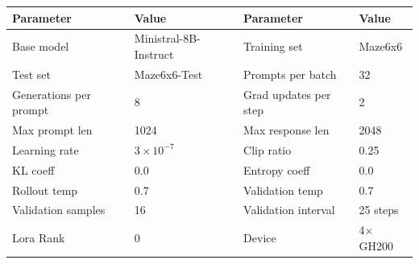 \documentclass{article}
\theoremstyle{plain}
\theoremstyle{definition}
\theoremstyle{remark}
\begin{document}
\begin{table}[h]
  \centering
  \label{tab:config-maze}
  \begin{tcolorbox}[
    enhanced, hbox,
    title={Training setup for Maze},
    colback=teal!5, colframe=teal, coltext=black, coltitle=white,
    fonttitle=\bfseries, arc=1mm, boxrule=1pt, boxsep=1pt,
    left=2pt, right=2pt, top=0pt, bottom=2pt,
    toptitle=3pt, bottomtitle=3pt, center
  ]
    \small
    \renewcommand{\arraystretch}{1.2}
    \setlength{\tabcolsep}{8pt}
    \begin{tabular}{l|l|l|l}
      \textbf{Parameter} & \textbf{Value} & \textbf{Parameter} & \textbf{Value} \\
      \hline
      Base model & Ministral-8B-Instruct & Training set & Maze6x6 \\
      Test set & Maze6x6-Test & Prompts per batch & 32 \\
      Generations per prompt & 8 & Grad updates per step & 2 \\
      Max prompt len & 1024 & Max response len & 2048 \\
      Learning rate & $3 \times 10^{-7}$ & Clip ratio & 0.25 \\
      KL coeff & 0.0 & Entropy coeff & 0.0 \\
      Rollout temp & 0.7 & Validation temp & 0.7 \\
      Validation samples & 16 & Validation interval & 25 steps \\
      Lora Rank & 0 & Device & 4$\times$GH200 \\
    \end{tabular}
  \end{tcolorbox}
\end{table}
\end{document}
